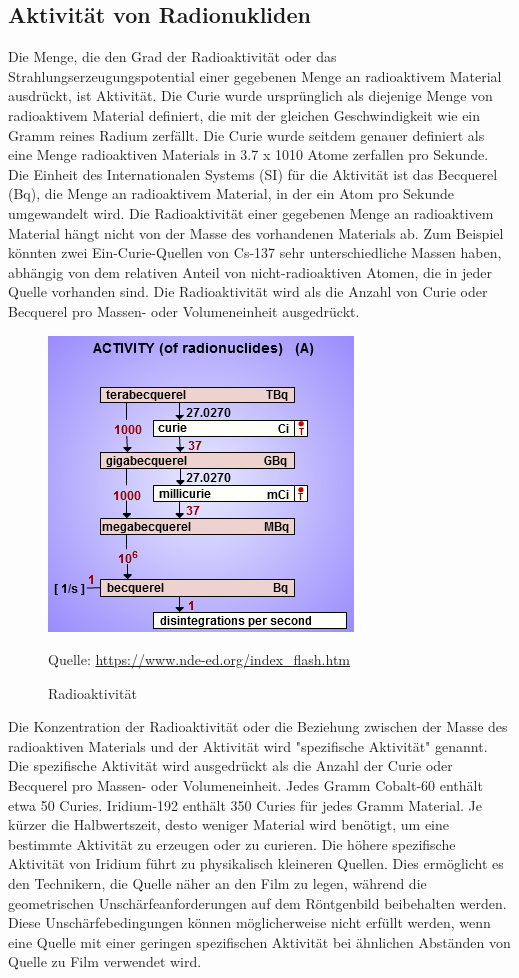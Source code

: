\subsection{Aktivität von Radionukliden}
Die Menge, die den Grad der Radioaktivität oder das Strahlungserzeugungspotential einer gegebenen Menge an radioaktivem Material ausdrückt, ist Aktivität.
Die Curie wurde ursprünglich als diejenige Menge von radioaktivem Material definiert, die mit der gleichen Geschwindigkeit wie ein Gramm reines Radium zerfällt.
Die Curie wurde seitdem genauer definiert als eine Menge radioaktiven Materials in
3.7 x 1010 Atome zerfallen pro Sekunde. Die Einheit des Internationalen Systems (SI) für die Aktivität ist das Becquerel (Bq), die Menge an radioaktivem Material, in der ein Atom pro Sekunde umgewandelt wird.
Die Radioaktivität einer gegebenen Menge an radioaktivem Material hängt nicht von der Masse des vorhandenen Materials ab.
Zum Beispiel könnten zwei Ein-Curie-Quellen von Cs-137 sehr unterschiedliche Massen haben, abhängig von dem relativen Anteil von nicht-radioaktiven Atomen, die in jeder Quelle vorhanden sind. Die Radioaktivität wird als die Anzahl von Curie oder Becquerel pro Massen- oder Volumeneinheit ausgedrückt.
\begin{figure}[htb]
  \centering  
  \includegraphics[scale=0.8]{img/activity.png}
  \caption{Radioaktivität}
  \label{fig:activity}
   Quelle: \url{https://www.nde-ed.org/index_flash.htm}
\end{figure}
Die Konzentration der Radioaktivität oder die Beziehung zwischen der Masse des radioaktiven Materials und der Aktivität wird "spezifische Aktivität" genannt. Die spezifische Aktivität wird ausgedrückt als die Anzahl der Curie oder Becquerel pro Massen- oder Volumeneinheit. Jedes Gramm Cobalt-60 enthält etwa 50 Curies. Iridium-192 enthält 350 Curies für jedes Gramm Material.
Je kürzer die Halbwertszeit, desto weniger Material wird benötigt, um eine bestimmte Aktivität zu erzeugen oder zu curieren.
Die höhere spezifische Aktivität von Iridium führt zu physikalisch kleineren Quellen. Dies ermöglicht es den Technikern, die Quelle näher an den Film zu legen, während die geometrischen Unschärfeanforderungen auf dem Röntgenbild beibehalten werden.
Diese Unschärfebedingungen können möglicherweise nicht erfüllt werden, wenn eine Quelle mit einer geringen spezifischen Aktivität bei ähnlichen Abständen von Quelle zu Film verwendet wird.
